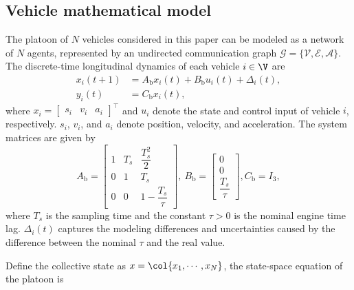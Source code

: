 \subsection{Vehicle mathematical model}\label{sec_vehiclemodel}
\vspace*{-0.3cm}
The platoon of $N$ vehicles considered in this paper can be modeled as a network of $N$ agents, represented by an undirected communication graph $\mathcal{G} = \{\mathcal{V}, \mathcal{E}, \mathcal{A}\}$.
The discrete-time longitudinal dynamics of each vehicle $i \in \V$ are
\begin{equation}\label{v_i}
    \begin{aligned}
        x_i(t+1) &= A_{\text{b}} x_i(t) + B_{\text{b}}u_{i}(t) + \Delta_i(t),\\
        y_i(t) &= C_{\text{b}} x_i(t),
    \end{aligned} 
\end{equation}
where $x_i=\begin{bmatrix} s_i & v_i & a_i \end{bmatrix}^{\top}$ and $u_i$ denote the state and control input of vehicle $i$, respectively. $s_i$, $v_i$, and $a_i$ denote position, velocity, and acceleration. The system matrices are given by 
\begin{equation*}
    A_{\text{b}}  =\begin{bmatrix}
    1 & T_s & \dfrac{T^2_s}{2} \\
    0 & 1 & T_s \\
    0 &  0 & 1 - \dfrac{T_s}{\tau}
        \end{bmatrix}, \
    B_{\text{b}} =\begin{bmatrix}
    0 \\
    0 \\
    \dfrac{T_s}{\tau}
        \end{bmatrix}, 
    C_{\text{b}} = I_{3}, 
\end{equation*}
where $T_s$ is the sampling time and the constant $\tau>0$ is the nominal engine time lag. $\Delta_i(t)$ captures the modeling differences and uncertainties caused by the difference between the nominal $\tau$ and the real value. 

Define the collective state as $x = \col{x_{1}, \cdots , x_{N}}$, the state-space equation of the platoon is 

